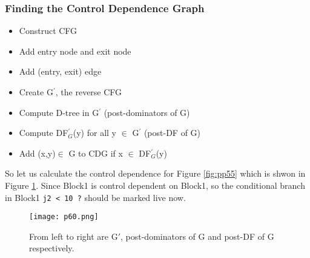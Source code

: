 \subsubsection{Finding the Control Dependence Graph}

\begin{itemize}
	\item Construct CFG
	\item Add entry node and exit node
	\item Add (entry, exit) edge
	\item Create G$^\prime$, the reverse CFG
	\item Compute D-tree in G$^\prime$ (post-dominators of G)
	\item Compute DF$_G^\prime$(y) for all y $\in$ G$^\prime$ (post-DF of G)
	\item Add (x,y)$\in$ G to CDG if x $\in$ DF$_G^\prime$(y)
\end{itemize}



So let us calculate the control dependence for Figure \ref{fig:pp55} which is shwon in Figure \ref{fig:p60}. Since Block1 is control dependent on Block1, so the conditional
branch in Block1 \texttt{j2 < 10 ?} should be marked live now.

\begin{figure}[H]
	\centering
	\texttt{[image: p60.png]}
	\caption{From left to right are G$\prime$, post-dominators of G and post-DF of G respectively.}
	\label{fig:p60}
\end{figure}



